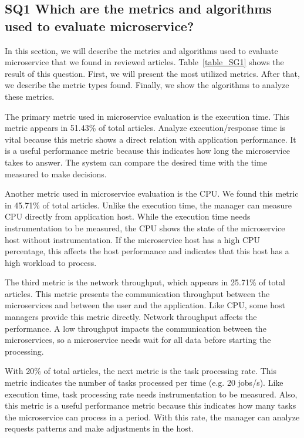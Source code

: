 \subsection{SQ1 Which are the metrics and algorithms used to evaluate microservice?}

In this section, we will describe the metrics and algorithms used to evaluate microservice that we found in reviewed articles. Table~\ref{table_SG1} shows the result of this question. First, we will present the most utilized metrics. After that, we describe the metric types found. Finally, we show the algorithms to analyze these metrics.

The primary metric used in microservice evaluation is the execution time. This metric appears in 51.43\% of total articles. Analyze execution/response time is vital because this metric shows a direct relation with application performance. It is a useful performance metric because this indicates how long the microservice takes to answer. The system can compare the desired time with the time measured to make decisions.

Another metric used in microservice evaluation is the CPU. We found this metric in 45.71\% of total articles. Unlike the execution time, the manager can measure CPU directly from application host. While the execution time needs instrumentation to be measured, the CPU shows the state of the microservice host without instrumentation. If the microservice host has a high CPU percentage, this affects the host performance and indicates that this host has a high workload to process.

The third metric is the network throughput, which appears in 25.71\% of total articles. This metric presents the communication throughput between the microservices and between the user and the application. Like CPU, some host managers provide this metric directly. Network throughput affects the performance. A low throughput impacts the communication between the microservices, so a microservice needs wait for all data before starting the processing.

With 20\% of total articles, the next metric is the task processing rate. This metric indicates the number of tasks processed per time (e.g. 20 jobs/s). Like execution time, task processing rate needs instrumentation to be measured. Also, this metric is a useful performance metric because this indicates how many tasks the microservice can process in a period. With this rate, the manager can analyze requests patterns and make adjustments in the host.

